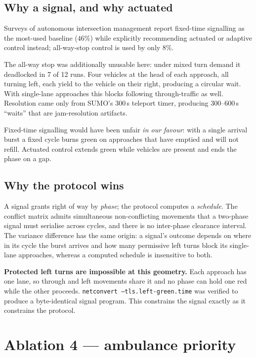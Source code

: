 \documentclass[11pt,a4paper]{article}
\newcommand{\code}[1]{\texttt{\small #1}}
\newcommand{\caveat}[1]{\textcolor{red!60!black}{\textbf{#1}}}
\begin{document}
\subsection*{Why a signal, and why actuated}

Surveys of autonomous intersection management report fixed-time signalling as
the most-used baseline ($46\%$) while explicitly recommending actuated or
adaptive control instead; all-way-stop control is used by only $8\%$.

The all-way stop was additionally unusable here: under mixed turn demand it
deadlocked in 7 of 12 runs. Four vehicles at the head of each approach, all
turning left, each yield to the vehicle on their right, producing a circular
wait. With single-lane approaches this blocks following through-traffic as well.
Resolution came only from SUMO's $300$\,s teleport timer, producing
$300$--$600$\,s ``waits'' that are jam-resolution artifacts.

Fixed-time signalling would have been unfair \emph{in our favour}: with a single
arrival burst a fixed cycle burns green on approaches that have emptied and will
not refill. Actuated control extends green while vehicles are present and ends
the phase on a gap.

\subsection*{Why the protocol wins}

A signal grants right of way by \emph{phase}; the protocol computes a
\emph{schedule}. The conflict matrix admits simultaneous non-conflicting
movements that a two-phase signal must serialise across cycles, and there is no
inter-phase clearance interval. The variance difference has the same origin: a
signal's outcome depends on where in its cycle the burst arrives and how many
permissive left turns block its single-lane approaches, whereas a computed
schedule is insensitive to both.

\caveat{Protected left turns are impossible at this geometry.} Each approach has
one lane, so through and left movements share it and no phase can hold one red
while the other proceeds. \code{netconvert --tls.left-green.time} was verified to
produce a byte-identical signal program. This constrains the signal exactly as
it constrains the protocol.

\section{Ablation 4 --- ambulance priority}
\end{document}
